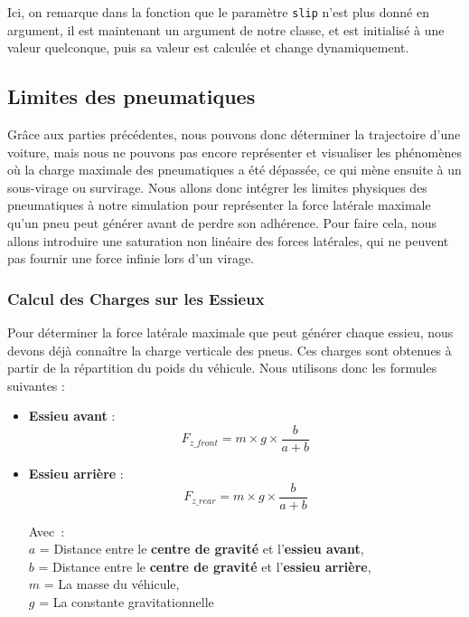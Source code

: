 Ici, on remarque dans la fonction que le paramètre \texttt{slip} n'est plus donné en argument, il est maintenant un argument de notre classe, et est initialisé à une valeur quelconque, puis sa valeur est calculée et change dynamiquement.

\subsection{Limites des pneumatiques}

Grâce aux parties précédentes, nous pouvons donc déterminer la trajectoire d'une voiture, mais nous ne pouvons pas encore représenter et visualiser les phénomènes où la charge maximale des pneumatiques a été dépassée, ce qui mène ensuite à un sous-virage ou survirage. Nous allons donc intégrer les limites physiques des pneumatiques à notre simulation pour représenter la force latérale maximale qu'un pneu peut générer avant de perdre son adhérence. Pour faire cela, nous allons introduire une saturation non linéaire des forces latérales, qui ne peuvent pas fournir une force infinie lors d'un virage.

\subsubsection{Calcul des Charges sur les Essieux}

Pour déterminer la force latérale maximale que peut générer chaque essieu, nous devons déjà connaître la charge verticale des pneus. Ces charges sont obtenues à partir de la répartition du poids du véhicule. Nous utilisons donc les formules suivantes :

\begin{itemize}
\item \textbf{Essieu avant} :
$$F_{z\_front} = m \times g \times \frac{b}{a+b}$$
\item \textbf{Essieu arrière} :
$$F_{z\_rear} = m \times g \times \frac{b}{a+b}$$

Avec :\\
$a$ = Distance entre le \textbf{centre de gravité} et l'\textbf{essieu avant},\\
$b$ = Distance entre le \textbf{centre de gravité} et l'\textbf{essieu arrière},\\
$m$ = La masse du véhicule, \\
$g$ = La constante gravitationnelle \\
\end{itemize}

